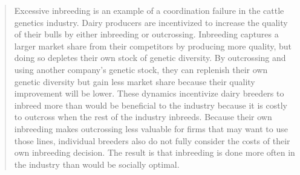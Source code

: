 \documentclass[12pt,letterpaper]{article}
\begin{document}
\begin{itemize}
\begin{quote}
Excessive inbreeding is an example of a coordination failure in the cattle genetics industry. 
Dairy producers are incentivized to increase the quality of their bulls by either inbreeding or outcrossing. 
Inbreeding captures a larger market share from their competitors by producing more quality, but doing so depletes their own stock of genetic diversity.
By outcrossing and using another company's genetic stock, they can replenish their own genetic diversity but gain less market share because their quality improvement will be lower.
These dynamics incentivize dairy breeders to inbreed more than would be beneficial to the industry because it is costly to outcross when the rest of the industry inbreeds.
Because their own inbreeding makes outcrossing less valuable for firms that may want to use those lines, individual breeders also do not fully consider the costs of their own inbreeding decision.
The result is that inbreeding is done more often in the industry than would be socially optimal.
\end{quote}


\end{itemize}
\end{document}
